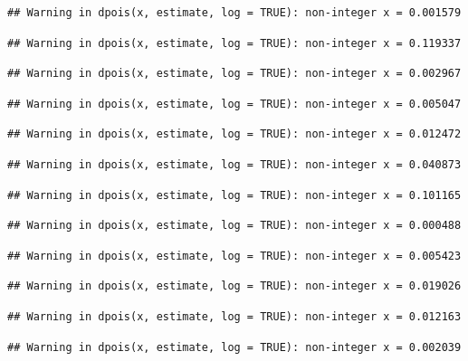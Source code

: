 \documentclass[]{article}
\begin{document}
\begin{verbatim}
## Warning in dpois(x, estimate, log = TRUE): non-integer x = 0.001579
\end{verbatim}

\begin{verbatim}
## Warning in dpois(x, estimate, log = TRUE): non-integer x = 0.119337
\end{verbatim}

\begin{verbatim}
## Warning in dpois(x, estimate, log = TRUE): non-integer x = 0.002967
\end{verbatim}

\begin{verbatim}
## Warning in dpois(x, estimate, log = TRUE): non-integer x = 0.005047
\end{verbatim}

\begin{verbatim}
## Warning in dpois(x, estimate, log = TRUE): non-integer x = 0.012472
\end{verbatim}

\begin{verbatim}
## Warning in dpois(x, estimate, log = TRUE): non-integer x = 0.040873
\end{verbatim}

\begin{verbatim}
## Warning in dpois(x, estimate, log = TRUE): non-integer x = 0.101165
\end{verbatim}

\begin{verbatim}
## Warning in dpois(x, estimate, log = TRUE): non-integer x = 0.000488
\end{verbatim}

\begin{verbatim}
## Warning in dpois(x, estimate, log = TRUE): non-integer x = 0.005423
\end{verbatim}

\begin{verbatim}
## Warning in dpois(x, estimate, log = TRUE): non-integer x = 0.019026
\end{verbatim}

\begin{verbatim}
## Warning in dpois(x, estimate, log = TRUE): non-integer x = 0.012163
\end{verbatim}

\begin{verbatim}
## Warning in dpois(x, estimate, log = TRUE): non-integer x = 0.002039
\end{verbatim}
\end{document}
